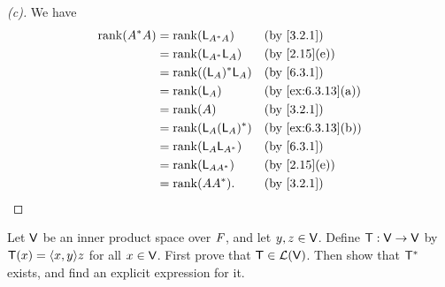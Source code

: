 \begin{proof}[(c)]
	We have
	\begin{align*}
		\rk{A^* A} & = \rk{\L_{A^* A}}    &  & \by{3.2.1}        \\
		           & = \rk{\L_{A^*} \L_A} &  & \by{2.15}[e]      \\
		           & = \rk{(\L_A)^* \L_A} &  & \by{6.3.1}        \\
		           & = \rk{\L_A}          &  & \by{ex:6.3.13}[a] \\
		           & = \rk{A}             &  & \by{3.2.1}        \\
		           & = \rk{\L_A (\L_A)^*} &  & \by{ex:6.3.13}[b] \\
		           & = \rk{\L_A \L_{A^*}} &  & \by{6.3.1}        \\
		           & = \rk{\L_{A A^*}}    &  & \by{2.15}[e]      \\
		           & = \rk{A A^*}.        &  & \by{3.2.1}
	\end{align*}
\end{proof}

\begin{ex}\label{ex:6.3.14}
	Let \(\mathsf{V}\) be an inner product space over \(\mathit{F}\), and let \(y, z \in \mathsf{V}\).
	Define \(\mathsf{T} : \mathsf{V} \to \mathsf{V}\) by \(\T(x) = \inn{x, y} z\) for all \(x \in \mathsf{V}\).
	First prove that \(\mathsf{T} \in \mathcal{L}(\mathsf{V})\).
	Then show that \(\mathsf{T}^*\) exists, and find an explicit expression for it.
\end{ex}


